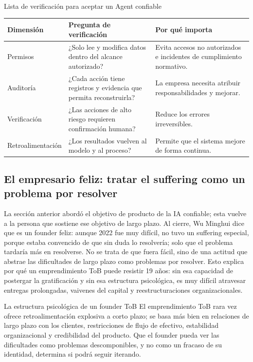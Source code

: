 \documentclass[a4paper]{article}
\begin{document}
\begin{knowledgebox}{Lista de verificación para aceptar un Agent confiable}
\begin{tabularx}{\textwidth}{p{}p{}X}
\toprule
Dimensión & Pregunta de verificación & Por qué importa \\
\midrule
Permisos & ¿Solo lee y modifica datos dentro del alcance autorizado? & Evita accesos no autorizados e incidentes de cumplimiento normativo. \\
Auditoría & ¿Cada acción tiene registros y evidencia que permita reconstruirla? & La empresa necesita atribuir responsabilidades y mejorar. \\
Verificación & ¿Las acciones de alto riesgo requieren confirmación humana? & Reduce los errores irreversibles. \\
Retroalimentación & ¿Los resultados vuelven al modelo y al proceso? & Permite que el sistema mejore de forma continua. \\
\bottomrule
\end{tabularx}
\end{knowledgebox}

\subsection{El empresario feliz: tratar el suffering como un problema por resolver}

La sección anterior abordó el objetivo de producto de la IA confiable; esta vuelve a la persona que sostiene ese objetivo de largo plazo. Al cierre, Wu Minghui dice que es un founder feliz: aunque 2022 fue muy difícil, no tuvo un suffering especial, porque estaba convencido de que sin duda lo resolvería; solo que el problema tardaría más en resolverse. No se trata de que fuera fácil, sino de una actitud que abstrae las dificultades de largo plazo como problemas por resolver. Esto explica por qué un emprendimiento ToB puede resistir 19 años: sin esa capacidad de postergar la gratificación y sin esa estructura psicológica, es muy difícil atravesar entregas prolongadas, vaivenes del capital y reestructuraciones organizacionales.

\begin{knowledgebox}{La estructura psicológica de un founder ToB}
El emprendimiento ToB rara vez ofrece retroalimentación explosiva a corto plazo; se basa más bien en relaciones de largo plazo con los clientes, restricciones de flujo de efectivo, estabilidad organizacional y credibilidad del producto. Que el founder pueda ver las dificultades como problemas descomponibles, y no como un fracaso de su identidad, determina si podrá seguir iterando.
\end{knowledgebox}
\end{document}
